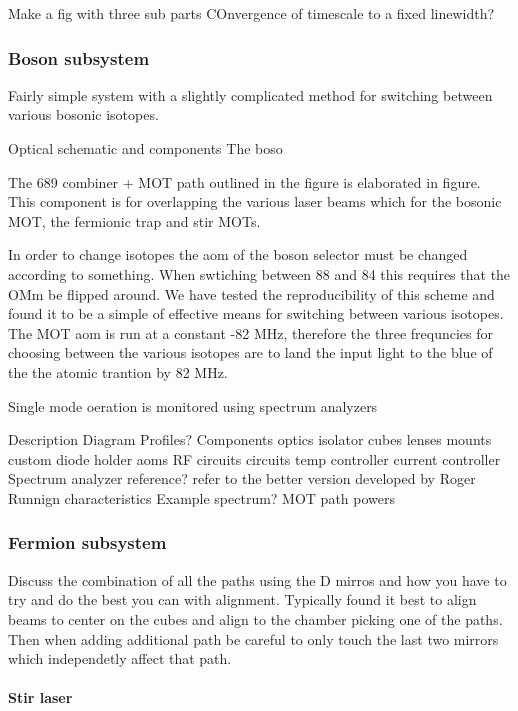 Make a fig with three sub parts
COnvergence of timescale to a fixed linewidth?


\subsubsection{Boson subsystem}

Fairly simple system with a slightly complicated method for switching between various bosonic isotopes.

Optical schematic and components
The boso

The 689 combiner + MOT path outlined in the figure is elaborated in figure.
This component is for overlapping the various laser beams which for the bosonic MOT, the fermionic trap and stir MOTs.

In order to change isotopes the aom of the boson selector must be changed according to something.
When swtiching between 88 and 84 this requires that the OMm be flipped around.
We have tested the reproducibility of this scheme and found it to be a simple of effective means for switching between various isotopes.
The MOT aom is run at a constant -82 MHz, therefore the three frequncies for choosing between the various isotopes are to land the input light to the blue of the the atomic trantion by 82 MHz.

Single mode oeration is monitored using spectrum analyzers 



Description
Diagram
	Profiles?
Components
	optics
		isolator
		cubes
		lenses
	mounts
		custom diode holder
	aoms
		RF circuits
	circuits
		temp controller
		current controller
	Spectrum analyzer
		reference?
		refer to the better version developed by Roger
Runnign characteristics
	Example spectrum?
	MOT path powers


\subsubsection{Fermion subsystem}

Discuss the combination of all the paths using the D mirros and how you have to try and do the best you can with alignment. Typically found it best to align beams to center on the cubes and align to the chamber picking one of the paths. Then when adding additional path be careful to only touch the last two mirrors which independetly affect that path.

\paragraph{Stir laser}

